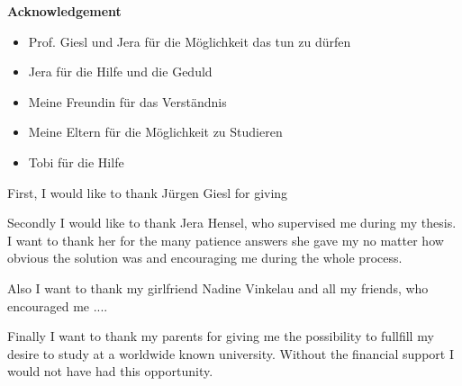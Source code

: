 {\bf\Large Acknowledgement} \\ [1em] 

\begin{itemize}
	\item Prof. Giesl und Jera für die Möglichkeit das tun zu dürfen
	\item Jera für die Hilfe und die Geduld
	\item Meine Freundin für das Verständnis
	\item Meine Eltern für die Möglichkeit zu Studieren
	\item Tobi für die Hilfe
\end{itemize}

First, I would like to thank Jürgen Giesl for giving 

Secondly I would like to thank Jera Hensel, who supervised me during my thesis. I want to thank her for the many patience answers she gave my no matter how obvious the solution was and encouraging me during the whole process. 

Also I want to thank my girlfriend Nadine Vinkelau and all my friends, who encouraged me ....

Finally I want to thank my parents for giving me the possibility to fullfill my desire to study at a worldwide known university. Without the financial support I would not have had this opportunity.  